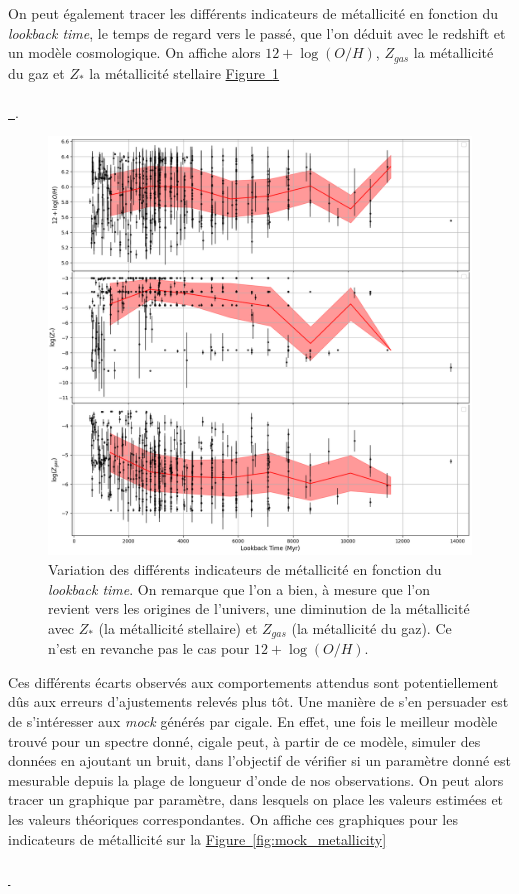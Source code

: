 \documentclass[12pt, a4paper]{article}
\newcommand*{\figref}[2][]{%
  \hyperref[{#2}]{%
    Figure~\ref*{#2}%
    \ifx\\#1\\%
    \else
      \,#1%
    \fi
  }%
}
\begin{document}
On peut également tracer les différents indicateurs de métallicité en fonction du \textit{lookback time}, le temps de regard vers le passé, que l'on déduit avec le redshift et un modèle cosmologique. On affiche alors $12 + \log(O/H)$, $Z_{gas}$ la métallicité du gaz et $Z_*$ la métallicité stellaire \figref{fig:metallicite_age}.

\begin{figure}[!h]
  \centering
  \includegraphics[width=1\textwidth]{assets/metallicite_w_age.png}
  \caption{Variation des différents indicateurs de métallicité en fonction du \textit{lookback time}. On remarque que l'on a bien, à mesure que l'on revient vers les origines de l'univers, une diminution de la métallicité avec $Z_*$ (la métallicité stellaire) et $Z_{gas}$ (la métallicité du gaz). Ce n'est en revanche pas le cas pour $12 + \log(O/H)$.}
  \label{fig:metallicite_age}
\end{figure}

Ces différents écarts observés aux comportements attendus sont potentiellement dûs aux erreurs d'ajustements relevés plus tôt. Une manière de s'en persuader est de s'intéresser aux \textit{mock} générés par \gls{cigale}. En effet, une fois le meilleur modèle trouvé pour un spectre donné, \gls{cigale} peut, à partir de ce modèle, simuler des données en ajoutant un bruit, dans l'objectif de vérifier si un paramètre donné est mesurable depuis la plage de longueur d'onde de nos observations. On peut alors tracer un graphique par paramètre, dans lesquels on place les valeurs estimées et les valeurs théoriques correspondantes. On affiche ces graphiques pour les indicateurs de métallicité sur la \figref{fig:mock_metallicity}
\end{document}
